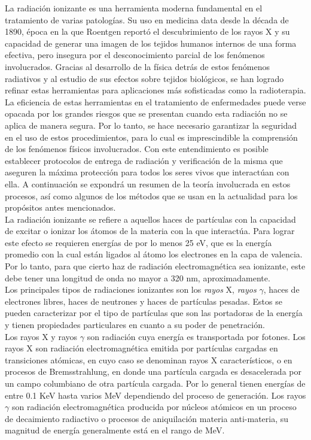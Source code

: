 La radiación ionizante es una herramienta moderna fundamental en el tratamiento de varias patologías. Su uso en medicina data desde la década de 1890, época en la que Roentgen reportó el descubrimiento de los rayos X y su capacidad de generar una imagen de los tejidos humanos internos de una forma efectiva, pero insegura por el desconocimiento parcial de los fenómenos involucrados. Gracias al desarrollo de la física detrás de estos fenómenos radiativos y al estudio de sus efectos sobre tejidos biológicos, se han logrado refinar estas herramientas para aplicaciones más sofisticadas como la radioterapia.\\

La eficiencia de estas herramientas en el tratamiento de enfermedades puede verse opacada por los grandes riesgos que se presentan cuando esta radiación no se aplica de manera segura. Por lo tanto, se hace necesario garantizar la seguridad en el uso de estos procedimientos, para lo cual es imprescindible la comprensión de los fenómenos físicos involucrados. Con este entendimiento es posible establecer protocolos de entrega de radiación y verificación de la misma que aseguren la máxima protección para todos los seres vivos que interactúan con ella. A continuación se expondrá un resumen de la teoría involucrada en estos procesos, así como algunos de los métodos que se usan en la actualidad para los propósitos antes mencionados.  \\

La radiación ionizante se refiere a aquellos haces de partículas con la capacidad de excitar o ionizar los átomos de la materia con la que interactúa. Para lograr este efecto se requieren energías de por lo menos 25 eV, que es la energía promedio con la cual están ligados al átomo los electrones en la capa de valencia. Por lo tanto, para que cierto haz de radiación electromagnética sea ionizante, este debe tener una longitud de onda no mayor a 320 nm, aproximadamente. \\

Los principales tipos de radiaciones ionizantes son los \textit{rayos} X, \textit{rayos }$\gamma$, haces de electrones libres, haces de neutrones y haces de partículas pesadas. Estos se pueden caracterizar por el tipo de partículas que son las portadoras de la energía y tienen propiedades particulares en cuanto a su poder de penetración.\\

Los rayos X y rayos $\gamma$ son radiación cuya energía es transportada por fotones. Los rayos X son radiación electromagnética emitida por partículas cargadas en transiciones atómicas, en cuyo caso se denominan rayos X característicos, o en procesos de Bremsstrahlung, en donde una partícula cargada es desacelerada por un campo columbiano de otra partícula cargada. Por lo general tienen energías de entre  0.1 KeV hasta varios MeV dependiendo del proceso de generación. Los rayos $\gamma$ son radiación electromagnética producida por núcleos atómicos en un proceso de decaimiento radiactivo o procesos de aniquilación materia anti-materia, su magnitud de energía generalmente está en el rango de MeV.\\

